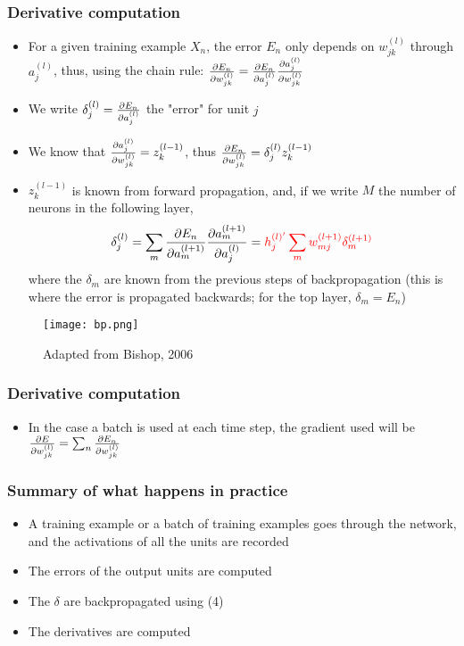 \documentclass{beamer}
\begin{document}
\begin{frame}
	\frametitle{Derivative computation}
    \begin{itemize}
    	\item For a given training example $X_n$, the error $E_n$ only depends on $w^{(l)}_{jk}$ through $a^{(l)}_j$, thus, using the chain rule:
        $\pdv{E_n}{w^{(l)}_{jk}} = \pdv{E_n}{a^{(l)}_j} \pdv{a^{(l)}_j}{w^{(l)}_{jk}}$
        
        \item We write \textcolor{red}{$\delta^{(l)}_j = \pdv{E_n}{a^{(l)}_j}$} the "error" for unit $j$
        \item We know that $\pdv{a^{(l)}_j}{w^{(l)}_{jk}}=z^{(l-1)}_k$, thus \textcolor{red}{$\pdv{E_n}{w^{(l)}_{jk}} = \delta^{(l)}_jz^{(l-1)}_k$}
        \item $z^{(l-1)}_k$ is known from forward propagation, and, if we write $M$ the number of neurons in the following layer, 
        \begin{equation}
          \delta^{(l)}_j = \sum_{m}\pdv{E_n}{a^{(l+1)}_m}\pdv{a^{(l+1)}_m}{a^{(l)}_j} = \color{red}h^{(l)'}_j\sum_{m}w^{(l+1)}_{mj}\delta^{(l+1)}_m
        \end{equation}where the $\delta_m$ are known from the previous steps of backpropagation (this is where the error is propagated backwards; for the top layer, $\delta_m=E_n$)
        \end{itemize}
\end{frame}


\begin{frame}
  \begin{figure}
  \texttt{[image: bp.png]}
  \caption{Adapted from Bishop, 2006}
  \end{figure}
\end{frame}
\begin{frame}
	\frametitle{Derivative computation}
    \begin{itemize}
        \item In the case a batch is used at each time step, the gradient used will be $\pdv{E}{w^{(l)}_{jk}}=\sum_n\pdv{E_n}{w^{(l)}_{jk}}$
        \end{itemize}
\end{frame}

\begin{frame}
	\frametitle{Summary of what happens in practice}
    \begin{itemize}
    	\item A training example or a batch of training examples goes through the network, and the activations of all the units are recorded
        \item The errors of the output units are computed
        \item The $\delta$ are backpropagated using (4)
        \item The derivatives are computed
  \end{itemize}
\end{frame}
\end{document}
